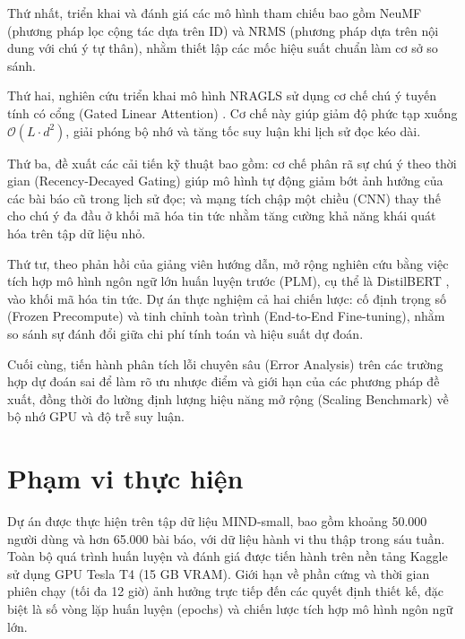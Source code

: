 \documentclass[../BTL.tex]{subfiles}
\begin{document}
Thứ nhất, triển khai và đánh giá các mô hình tham chiếu bao gồm NeuMF (phương pháp lọc cộng tác dựa trên ID) và NRMS (phương pháp dựa trên nội dung với chú ý tự thân), nhằm thiết lập các mốc hiệu suất chuẩn làm cơ sở so sánh.

Thứ hai, nghiên cứu triển khai mô hình NRAGLS sử dụng cơ chế chú ý tuyến tính có cổng (Gated Linear Attention) \cite{yang2023gla}. Cơ chế này giúp giảm độ phức tạp xuống $\mathcal{O}(L \cdot d^2)$, giải phóng bộ nhớ và tăng tốc suy luận khi lịch sử đọc kéo dài.

Thứ ba, đề xuất các cải tiến kỹ thuật bao gồm: cơ chế phân rã sự chú ý theo thời gian (Recency-Decayed Gating) giúp mô hình tự động giảm bớt ảnh hưởng của các bài báo cũ trong lịch sử đọc; và mạng tích chập một chiều (CNN) thay thế cho chú ý đa đầu ở khối mã hóa tin tức nhằm tăng cường khả năng khái quát hóa trên tập dữ liệu nhỏ.

Thứ tư, theo phản hồi của giảng viên hướng dẫn, mở rộng nghiên cứu bằng việc tích hợp mô hình ngôn ngữ lớn huấn luyện trước (PLM), cụ thể là DistilBERT \cite{sanh2019distilbert}, vào khối mã hóa tin tức. Dự án thực nghiệm cả hai chiến lược: cố định trọng số (Frozen Precompute) và tinh chỉnh toàn trình (End-to-End Fine-tuning), nhằm so sánh sự đánh đổi giữa chi phí tính toán và hiệu suất dự đoán.

Cuối cùng, tiến hành phân tích lỗi chuyên sâu (Error Analysis) trên các trường hợp dự đoán sai để làm rõ ưu nhược điểm và giới hạn của các phương pháp đề xuất, đồng thời đo lường định lượng hiệu năng mở rộng (Scaling Benchmark) về bộ nhớ GPU và độ trễ suy luận.

\section{Phạm vi thực hiện}

Dự án được thực hiện trên tập dữ liệu MIND-small, bao gồm khoảng 50.000 người dùng và hơn 65.000 bài báo, với dữ liệu hành vi thu thập trong sáu tuần. Toàn bộ quá trình huấn luyện và đánh giá được tiến hành trên nền tảng Kaggle sử dụng GPU Tesla T4 (15 GB VRAM). Giới hạn về phần cứng và thời gian phiên chạy (tối đa 12 giờ) ảnh hưởng trực tiếp đến các quyết định thiết kế, đặc biệt là số vòng lặp huấn luyện (epochs) và chiến lược tích hợp mô hình ngôn ngữ lớn.
\end{document}
